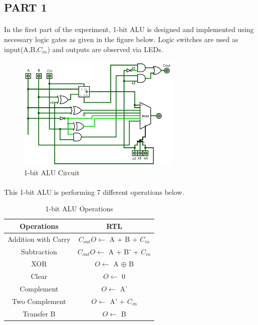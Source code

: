 \documentclass[pdftex,12pt,a4paper]{article}
\begin{document}
\begin{flushleft}
\subsection{PART 1}

\paragraph{}
In the first part of the experiment, 1-bit ALU is designed and implemented using necessary logic gates as given in the figure below. Logic switches are used as input(A,B,$C_{in}$) and outputs are observed via LEDs.

\begin{figure}[h]
	\centering
	\includegraphics[width=0.7\textwidth]{ALU.png}	
	\caption{1-bit ALU Circuit}
	\label{circ:part1}
\end{figure}

\paragraph{}
This 1-bit ALU is performing 7 different operations below.

\begin{table}[h]
    \centering
    \begin{tabular}{c|c}
        Operations & RTL  \\ \hline
        Addition with Carry & $C_{out}O\leftarrow$ A + B + $C_{in}$ \\
        Subtraction & $C_{out}O\leftarrow$ A + B' + $C_{in}$ \\
        XOR & $O\leftarrow$ A $\oplus$ B  \\
        Clear & $O\leftarrow$ 0 \\
        Complement & $O\leftarrow$ A' \\
        Two Complement & $O\leftarrow$ A' + $C_{in}$ \\
        Transfer B & $O\leftarrow$ B\\
    \end{tabular}
    \caption{1-bit ALU Operations}
    \label{1bitaluoperations}
\end{table}


\end{flushleft}
\end{document}

